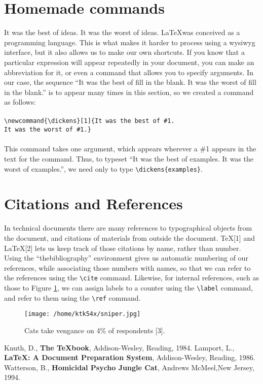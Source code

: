 \documentclass[12pt]{article}
\begin{document}
	\section{Homemade commands}
	\newcommand{\dickens}[1]{It was the best of #1. It was the worst of #1.}
	It was the best of ideas. It was the worst of ideas. \LaTeX was conceived as
	a programming language. This is what makes it harder to process using a
	wysiwyg interface, but it also allows us to make our own shortcuts. If you
	know that a particular expression will appear repeatedly in your document,
	you can make an abbreviation for it, or even a command that allows you to
	specify arguments. In our case, the sequence ``\dickens{fill in the blank}'' is to appear many times in this
	section, so we created a command as follows:\\\\
	\verb|\newcommand{\dickens}[1]{It was the best of #1.|\\
	\verb|It was the worst of #1.}|\\\\
	This command takes one argument, which appears wherever a \#1 appears
	in the text for the command. Thus, to typeset ``\dickens{examples}'', we need only to type \verb|\dickens{examples}|.
	
	\section{Citations and References}
	In technical documents there are many references to typographical objects
	from the document, and citations of materials from outside the document.
	\TeX[1] and \LaTeX[2] lets us keep track of those citations by name, rather
	than number. Using the ``thebibliography'' environment gives us automatic
	numbering of our references, while associating those numbers with names,
	so that we can refer to the references using the \verb|\cite| command. Likewise,
	for internal references, such as those to Figure \ref{cat}, we can assign labels to
	a counter using the \verb|\label| command, and refer to them using the \verb|\ref|
	command.
	\begin{figure}[t]
		\centering
		\texttt{[image: /home/ktk54x/sniper.jpg]}
		\caption{Cats take vengance on 4\% of respondents [3].}
		\label{cat}
	\end{figure}
	\begin{thebibliography}{9}
		 Knuth, D., \textbf{The \TeX book}, Addison-Wesley, Reading, 1984.
		 Lamport, L., \textbf{\LaTeX: A Document Preparation System}, Addison-Wesley, Reading, 1986.
		 Watterson, B., \textbf{Homicidal Psycho Jungle Cat}, Andrews McMeel,New Jersey, 1994.
	\end{thebibliography}
\end{document}
